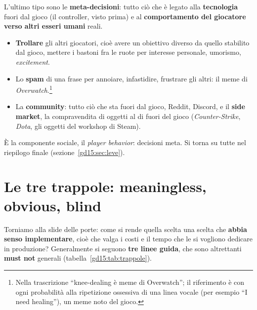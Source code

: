 L'ultimo tipo sono le \textbf{meta-decisioni}: tutto ciò che è legato alla
\textbf{tecnologia} fuori dal gioco (il controller, visto prima) e al
\textbf{comportamento del giocatore verso altri esseri umani} reali.
\begin{itemize}
  \item \textbf{Trollare} gli altri giocatori, cioè avere un obiettivo
        diverso da quello stabilito dal gioco, mettere i bastoni fra le
        ruote per interesse personale, umorismo, \emph{excitement}.
  \item Lo \textbf{spam} di una frase per annoiare, infastidire, frustrare
        gli altri: il meme di \emph{Overwatch}.\footnote{Nella trascrizione
        ``knee-dealing è meme di Overwatch''; il riferimento è con ogni
        probabilità alla ripetizione ossessiva di una linea vocale (per
        esempio ``I need healing''), un meme noto del gioco.}
  \item La \textbf{community}: tutto ciò che sta fuori dal gioco, Reddit,
        Discord, e il \textbf{side market}, la compravendita di oggetti al
        di fuori del gioco (\emph{Counter-Strike}, \emph{Dota}, gli oggetti
        del workshop di Steam).
\end{itemize}
È la componente sociale, il \emph{player behavior}: decisioni meta. Si
torna su tutte nel riepilogo finale (sezione~\ref{gd15:sec:leve}).

\section{Le tre trappole: meaningless, obvious, blind}
\label{gd15:sec:trappole}



Torniamo alla slide delle porte: come si rende quella scelta una scelta che
\textbf{abbia senso implementare}, cioè che valga i costi e il tempo che le
si vogliono dedicare in produzione? Generalmente si seguono \textbf{tre
linee guida}, che sono altrettanti \textbf{must not} generali
(tabella~\ref{gd15:tab:trappole}).

